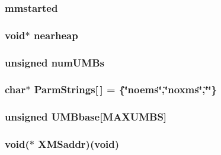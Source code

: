 \label{ID__MM_8C_aca288c079a7723294af053529cd35cfb}
\hypertarget{ID__MM_8C_ad8f4bbba342cb366093cbf387ee765e0}{
\subsubsection[{mmstarted}]{ {\bf mmstarted}}}
\label{ID__MM_8C_ad8f4bbba342cb366093cbf387ee765e0}
\hypertarget{ID__MM_8C_ac7faf2fe2aacd6309c7ccc8c000fd384}{
\subsubsection[{nearheap}]{\setlength{\rightskip}{0pt plus 5cm}void$\ast$ {\bf nearheap}}}
\label{ID__MM_8C_ac7faf2fe2aacd6309c7ccc8c000fd384}
\hypertarget{ID__MM_8C_a43127bf93728af9cfda3afb6ab3def5d}{
\subsubsection[{numUMBs}]{\setlength{\rightskip}{0pt plus 5cm}unsigned {\bf numUMBs}}}
\label{ID__MM_8C_a43127bf93728af9cfda3afb6ab3def5d}
\hypertarget{ID__MM_8C_af8599e1c1fbb3afabbdaa22e7c4a94b0}{
\subsubsection[{ParmStrings}]{\setlength{\rightskip}{0pt plus 5cm}char$\ast$ {\bf ParmStrings}\mbox{[}$\,$\mbox{]} = \{\char`\"{}noems\char`\"{},\char`\"{}noxms\char`\"{},\char`\"{}\char`\"{}\}}}
\label{ID__MM_8C_af8599e1c1fbb3afabbdaa22e7c4a94b0}
\hypertarget{ID__MM_8C_a81cb635daffbf2fe86d9a814a0e98de1}{
\subsubsection[{UMBbase}]{\setlength{\rightskip}{0pt plus 5cm}unsigned {\bf UMBbase}\mbox{[}MAXUMBS\mbox{]}}}
\label{ID__MM_8C_a81cb635daffbf2fe86d9a814a0e98de1}
\hypertarget{ID__MM_8C_a2930e4b216dbf278c4e5240d6a91838a}{
\subsubsection[{XMSaddr}]{\setlength{\rightskip}{0pt plus 5cm}void($\ast$  {\bf XMSaddr})(void)}}
\label{ID__MM_8C_a2930e4b216dbf278c4e5240d6a91838a}
